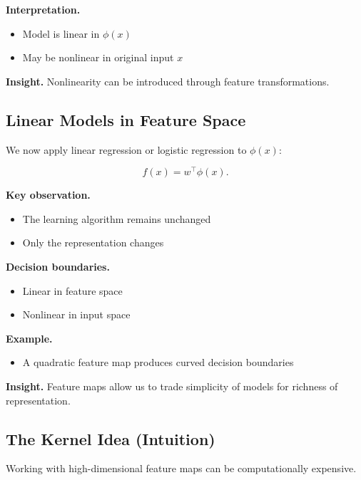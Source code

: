 \medskip

\noindent
\textbf{Interpretation.}
\begin{itemize}
    \item Model is linear in $\phi(x)$
    \item May be nonlinear in original input $x$
\end{itemize}

\medskip

\noindent
\textbf{Insight.}  
Nonlinearity can be introduced through feature transformations.

\subsection{Linear Models in Feature Space}

We now apply linear regression or logistic regression to $\phi(x)$:

\[
f(x) = w^\top \phi(x).
\]

\medskip

\noindent
\textbf{Key observation.}
\begin{itemize}
    \item The learning algorithm remains unchanged
    \item Only the representation changes
\end{itemize}

\medskip

\noindent
\textbf{Decision boundaries.}
\begin{itemize}
    \item Linear in feature space
    \item Nonlinear in input space
\end{itemize}

\medskip

\noindent
\textbf{Example.}
\begin{itemize}
    \item A quadratic feature map produces curved decision boundaries
\end{itemize}

\medskip

\noindent
\textbf{Insight.}  
Feature maps allow us to trade simplicity of models for richness of representation.

\subsection{The Kernel Idea (Intuition)}

Working with high-dimensional feature maps can be computationally expensive.

